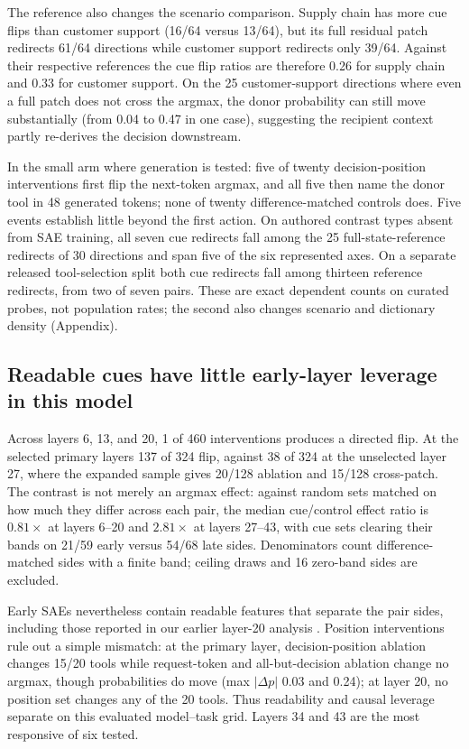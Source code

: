 \documentclass{article}
\begin{document}
The reference also changes the scenario comparison. Supply chain has more cue
flips than customer support (16/64 versus 13/64), but its full residual patch
redirects 61/64 directions while customer support redirects only 39/64.
Against their respective references the cue flip ratios are therefore 0.26 for
supply chain and 0.33 for customer support.
On the 25 customer-support directions where even a full patch does not cross
the argmax, the donor probability can still move substantially (from 0.04 to
0.47 in one case), suggesting the recipient context partly re-derives the
decision downstream.

In the small arm where generation is tested:
five of twenty decision-position interventions first flip the next-token
argmax, and all five then name the donor tool in 48 generated tokens; none of
twenty difference-matched controls does. Five events establish little beyond
the first action. On authored contrast types absent from SAE training, all
seven cue redirects fall among the 25 full-state-reference redirects of 30
directions and span five of the six represented axes. On a separate released
tool-selection split both cue redirects fall among thirteen reference
redirects, from two of seven pairs. These are exact dependent counts on curated
probes, not population rates; the second also changes scenario and dictionary
density (Appendix).

\subsection{Readable cues have little early-layer leverage in this model}
\label{sec:depth}

Across layers 6, 13, and 20, 1 of 460 interventions produces a directed flip.
At the selected primary layers 137 of 324 flip, against 38 of 324 at the
unselected layer 27, where the expanded sample gives 20/128 ablation and 15/128
cross-patch. The contrast is not merely an argmax effect: against random sets matched
on how much they differ across each pair, the median cue/control effect ratio
is $0.81\times$ at layers 6--20 and $2.81\times$ at layers 27--43, with cue
sets clearing their bands on 21/59 early versus 54/68 late sides. Denominators
count difference-matched sides with a finite band; ceiling draws and 16
zero-band sides are excluded.

Early SAEs nevertheless contain readable features that separate the pair
sides, including those reported in our earlier layer-20 analysis
\citep{ref_hapke2025}. Position interventions rule out a simple mismatch:
at the primary layer, decision-position ablation changes 15/20 tools while
request-token and all-but-decision ablation change no argmax, though
probabilities do move (max $|\Delta p|$ 0.03 and 0.24); at layer 20, no
position set changes any of the 20 tools. Thus readability and causal leverage
separate on this evaluated model--task grid. Layers 34 and 43 are the most
responsive of six tested.
\end{document}
